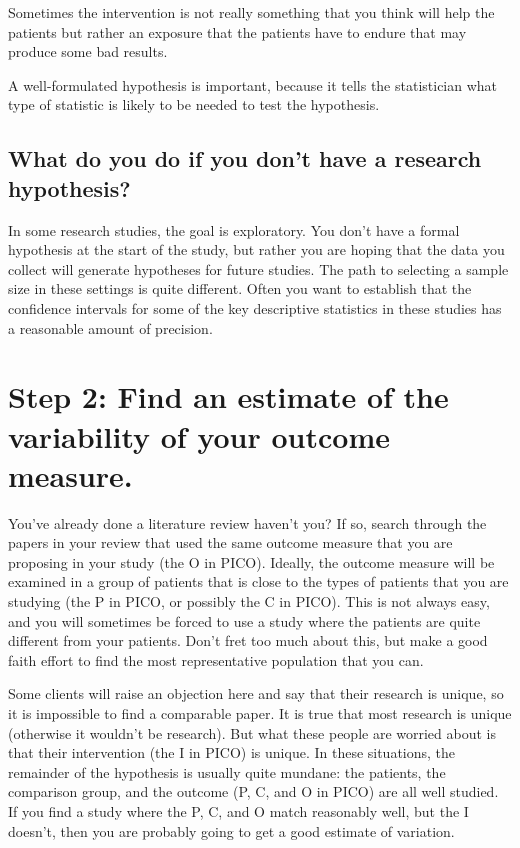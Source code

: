 \documentclass[
  letterpaper,
  DIV=11,
  numbers=noendperiod]{scrreprt}
\begin{document}
Sometimes the intervention is not really something that you think will
help the patients but rather an exposure that the patients have to
endure that may produce some bad results.

A well-formulated hypothesis is important, because it tells the
statistician what type of statistic is likely to be needed to test the
hypothesis.

\subsection{What do you do if you don't have a research
hypothesis?}\label{what-do-you-do-if-you-dont-have-a-research-hypothesis}

In some research studies, the goal is exploratory. You don't have a
formal hypothesis at the start of the study, but rather you are hoping
that the data you collect will generate hypotheses for future studies.
The path to selecting a sample size in these settings is quite
different. Often you want to establish that the confidence intervals for
some of the key descriptive statistics in these studies has a reasonable
amount of precision.

\section{Step 2: Find an estimate of the variability of your outcome
measure.}\label{step-2-find-an-estimate-of-the-variability-of-your-outcome-measure.}

You've already done a literature review haven't you? If so, search
through the papers in your review that used the same outcome measure
that you are proposing in your study (the O in PICO). Ideally, the
outcome measure will be examined in a group of patients that is close to
the types of patients that you are studying (the P in PICO, or possibly
the C in PICO). This is not always easy, and you will sometimes be
forced to use a study where the patients are quite different from your
patients. Don't fret too much about this, but make a good faith effort
to find the most representative population that you can.

Some clients will raise an objection here and say that their research is
unique, so it is impossible to find a comparable paper. It is true that
most research is unique (otherwise it wouldn't be research). But what
these people are worried about is that their intervention (the I in
PICO) is unique. In these situations, the remainder of the hypothesis is
usually quite mundane: the patients, the comparison group, and the
outcome (P, C, and O in PICO) are all well studied. If you find a study
where the P, C, and O match reasonably well, but the I doesn't, then you
are probably going to get a good estimate of variation.
\end{document}
